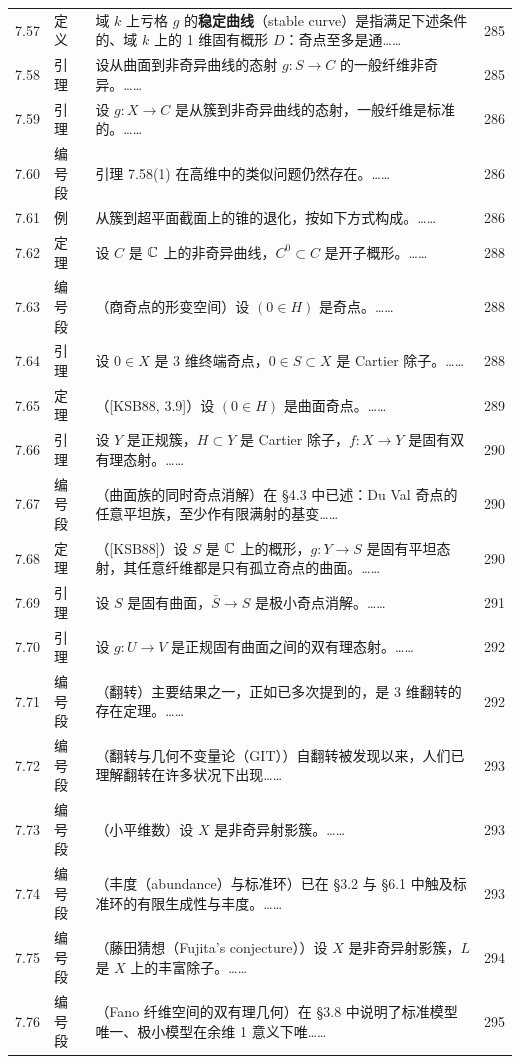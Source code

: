 \begin{longtable}{@{}p{}p{}p{}p{}@{}}
7.57 & 定义 & 域 $k$ 上亏格 $g$ 的\textbf{稳定曲线}（stable curve）是指满足下述条件的、域 $k$ 上的 1 维固有概形 $D$：奇点至多是通…… & 285 \\
7.58 & 引理 & 设从曲面到非奇异曲线的态射 $g\colon S\to C$ 的一般纤维非奇异。…… & 285 \\
7.59 & 引理 & 设 $g\colon X\to C$ 是从簇到非奇异曲线的态射，一般纤维是标准的。…… & 286 \\
7.60 & 编号段 & 引理 7.58(1) 在高维中的类似问题仍然存在。…… & 286 \\
7.61 & 例 & 从簇到超平面截面上的锥的退化，按如下方式构成。…… & 286 \\
7.62 & 定理 & 设 $C$ 是 $\mathbb{C}$ 上的非奇异曲线，$C^0\subset C$ 是开子概形。…… & 288 \\
7.63 & 编号段 & （商奇点的形变空间）\quad 设 $(0\in H)$ 是奇点。…… & 288 \\
7.64 & 引理 & 设 $0\in X$ 是 3 维终端奇点，$0\in S\subset X$ 是 Cartier 除子。…… & 288 \\
7.65 & 定理 & （[KSB88, 3.9]）设 $(0\in H)$ 是曲面奇点。…… & 289 \\
7.66 & 引理 & 设 $Y$ 是正规簇，$H\subset Y$ 是 Cartier 除子，$f\colon X\to Y$ 是固有双有理态射。…… & 290 \\
7.67 & 编号段 & （曲面族的同时奇点消解）\quad 在 §4.3 中已述：Du Val 奇点的任意平坦族，至少作有限满射的基变…… & 290 \\
7.68 & 定理 & （[KSB88]）设 $S$ 是 $\mathbb{C}$ 上的概形，$g\colon Y\to S$ 是固有平坦态射，其任意纤维都是只有孤立奇点的曲面。…… & 290 \\
7.69 & 引理 & 设 $S$ 是固有曲面，$\bar S\to S$ 是极小奇点消解。…… & 291 \\
7.70 & 引理 & 设 $g\colon U\to V$ 是正规固有曲面之间的双有理态射。…… & 292 \\
7.71 & 编号段 & （翻转）\quad 主要结果之一，正如已多次提到的，是 3 维翻转的存在定理。…… & 292 \\
7.72 & 编号段 & （翻转与几何不变量论（GIT））\quad 自翻转被发现以来，人们已理解翻转在许多状况下出现…… & 293 \\
7.73 & 编号段 & （小平维数）\quad 设 $X$ 是非奇异射影簇。…… & 293 \\
7.74 & 编号段 & （丰度（abundance）与标准环）\quad 已在 §3.2 与 §6.1 中触及标准环的有限生成性与丰度。…… & 293 \\
7.75 & 编号段 & （藤田猜想（Fujita's conjecture））\quad 设 $X$ 是非奇异射影簇，$L$ 是 $X$ 上的丰富除子。…… & 294 \\
7.76 & 编号段 & （Fano 纤维空间的双有理几何）\quad 在 §3.8 中说明了标准模型唯一、极小模型在余维 1 意义下唯…… & 295 \\

\end{longtable}
